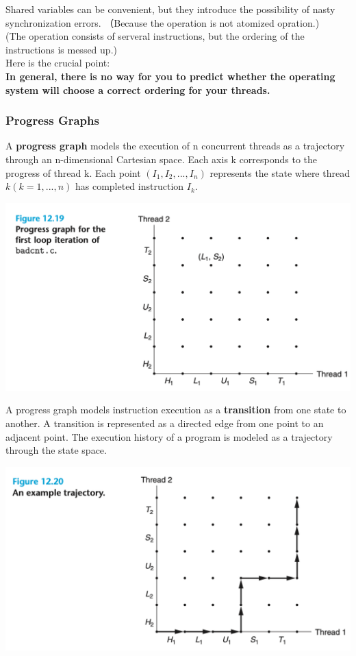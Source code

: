 \documentclass[11pt]{article}
\begin{document}
Shared variables can be convenient, but they introduce the possibility of nasty synchronization errors. （Because the operation is not atomized opration.)\\
(The operation consists of serveral instructions, but the ordering of the instructions is messed up.)\\

Here is the crucial point:\\
\textbf{In general, there is no way for you to predict whether the operating system will choose a correct ordering for your threads.}\\


\subsubsection{Progress Graphs}
\label{sec:orgd8dfb1b}
A \textbf{progress graph} models the execution of n concurrent threads as a trajectory through an n-dimensional Cartesian space. Each axis k corresponds to the progress of thread k. Each point \((I_1, I_2, ... , I_n)\) represents the state where thread \(k (k = 1, ... , n)\) has completed instruction \(I_k\).\\

\begin{center}
\includegraphics[width=.9\linewidth]{pics/figure12.19-progress-graph.png}
\end{center}


A progress graph models instruction execution as a \textbf{transition} from one state to another. A transition is represented as a directed edge from one point to an adjacent point. The execution history of a program is modeled as a trajectory through the state space.\\

\begin{center}
\includegraphics[width=.9\linewidth]{pics/figure12.20-trajectory.png}
\end{center}
\end{document}
